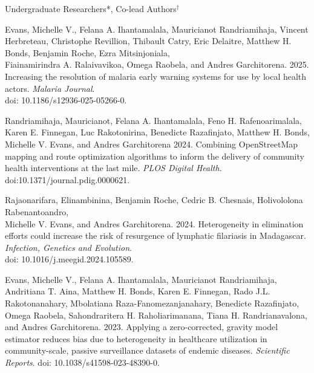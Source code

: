 


\bigskip
Undergraduate Researchers*, Co-lead Authors$^\dagger$

\smallskip

\begin{etaremune}

\item \textcolor{awesome}{Evans, Michelle V.}, Felana A. Ihantamalala, Mauricianot Randriamihaja, Vincent Herbreteau, Christophe Revillion, Thibault Catry, Eric Delaitre, Matthew H. Bonds, Benjamin Roche, Ezra Mitsinjoniala, \\ Fiainamirindra A. Ralaivavikoa, Omega Raobela, and Andres Garchitorena. 2025. Increasing the resolution of malaria early warning systems for use by local health actors. \textit{Malaria Journal}. \\ doi: 10.1186/s12936-025-05266-0. \smallskip

\item Randriamihaja, Mauricianot, Felana A. Ihantamalala, Feno H. Rafenoarimalala, Karen E. Finnegan, Luc Rakotonirina, Benedicte Razafinjato, Matthew H. Bonds, \textcolor{awesome}{Michelle V. Evans}, and Andres Garchitorena 2024. Combining OpenStreetMap mapping and route optimization algorithms to inform the delivery of community health interventions at the last mile. \textit{PLOS Digital Health}. doi:10.1371/journal.pdig.0000621. \smallskip

\item Rajaonarifara, Elinambinina, Benjamin Roche, Cedric B. Chesnais, Holivololona Rabenantoandro, \\ \textcolor{awesome}{Michelle V. Evans}, and Andres Garchitorena. 2024. Heterogeneity in elimination efforts could increase the risk of resurgence of lymphatic filariasis in Madagascar. \textit{Infection, Genetics and Evolution}. \\ doi: 10.1016/j.meegid.2024.105589. \smallskip


\item \textcolor{awesome}{Evans, Michelle V.}, Felana A. Ihantamalala, Mauricianot Randriamihaja, Andritiana T. Aina, Matthew H. Bonds, Karen E. Finnegan, Rado J.L. Rakotonanahary, Mbolatiana Raza-Fanomezanjanahary, Benedicte Razafinjato, Omega Raobela, Sahondraritera H. Raholiarimanana, Tiana H. Randrianavalona, and Andres Garchitorena. 2023. Applying a zero-corrected, gravity model estimator reduces bias due to heterogeneity in healthcare utilization in community-scale, passive surveillance datasets of endemic diseases. \textit{Scientific Reports}. doi: 10.1038/s41598-023-48390-0. \smallskip



\end{etaremune}
